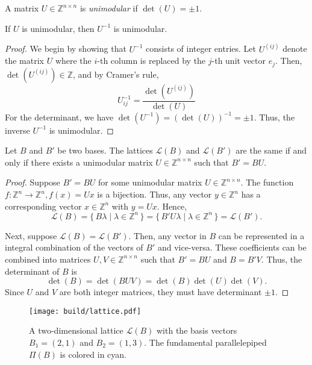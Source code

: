 \begin{definition}
  A matrix $U ∈ ℤ^{n×n}$ is \emph{unimodular} if $\det(U) = ±1$.
\end{definition}

\begin{lemma}
  If $U$ is unimodular, then $U^{-1}$ is unimodular.
\end{lemma}

\begin{proof}
  We begin by showing that $U^{-1}$ consists of integer entries.
  Let $U^{(ij)}$ denote the matrix $U$ where the $i$-th column is replaced by the $j$-th unit vector $e_j$.
  Then, $\det(U^{(ij)}) ∈ ℤ$, and by Cramer's rule,
  \[
    U_{ij}^{-1} = \frac{\det(U^{(ij)})}{\det(U)}
  \]
  For the determinant, we have $\det(U^{-1}) = (\det(U))^{-1} = ±1$.
  Thus, the inverse $U^{-1}$ is unimodular.
\end{proof}

\begin{lemma}
  \label{lem:unimodular}
  Let $B$ and $B'$ be two bases.
  The lattices $\mathcal L(B)$ and $\mathcal L(B')$ are the same if and only if
  there exists a unimodular matrix $U ∈ ℤ^{n×n}$ such that $B' = BU$.
\end{lemma}

\begin{proof}
  Suppose $B' = BU$ for some unimodular matrix $U ∈ ℤ^{n×n}$.
  The function $f \colon ℤ^n → ℤ^n, f(x) = Ux$ is a bijection.
  Thus, any vector $y ∈ ℤ^n$ has a corresponding vector $x ∈ ℤ^n$ with $y = Ux$.
  Hence,
  \[
    \mathcal L(B)  = \{\, B λ \mid λ ∈ ℤ^n \,\} = \{\, B' U λ \mid λ ∈ ℤ^n \,\} = \mathcal L(B').
  \]

  Next, suppose $\mathcal L(B) = \mathcal L(B')$.
  Then, any vector in $B$ can be represented in a integral combination of the
  vectors of $B'$ and vice-versa.
  These coefficients can be combined into matrices $U, V ∈ ℤ^{n×n}$ such that $B' = BU$ and $B = B'V$.
  Thus, the determinant of $B$ is
  \[
    \det(B) = \det(BUV) = \det(B) \det(U) \det(V).
  \]
  Since $U$ and $V$ are both integer matrices,
  they must have determinant $±1$.
\end{proof}

\begin{figure}[tbp]
  \centering
  \texttt{[image: build/lattice.pdf]}
  \caption{
    A two-dimensional lattice $\mathcal L(B)$ with the basis vectors $B_1 = (2, 1)$
    and $B_2 = (1, 3)$.
    The fundamental parallelepiped $Π(B)$ is colored in {\color{cyan}cyan}.
  }
\end{figure}

